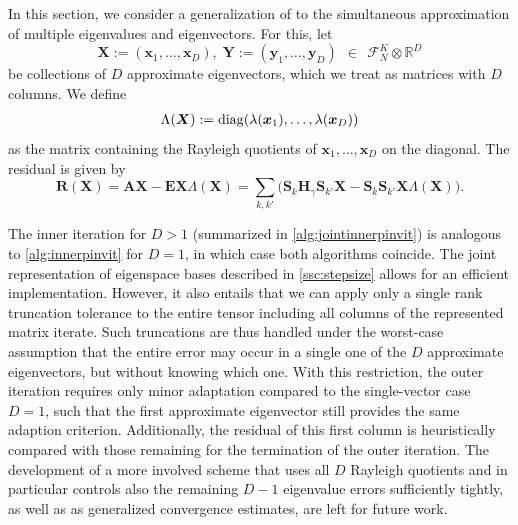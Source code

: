\documentclass[a4paper,11pt,oneside]{amsart}
\newcommand\diag{\mathop{\rm diag}}
\theoremstyle{definition}
\theoremstyle{remark}
\newcommand{\cF}{{\mathcal{F}}}
\newcommand{\A}{\ten A}
\newcommand{\E}{\ten E}
\newcommand{\R}{\mathbb{R}}
\newcommand{\ten}[1]{\boldsymbol{#1}}
\numberwithin{equation}{section}
\numberwithin{theorem}{section}
\begin{document}
In this section, we consider a generalization of  to the simultaneous approximation of multiple eigenvalues and eigenvectors. For this, let
\begin{equation}
 \ten{X} := (\ten{x}_1,\ldots,\ten{x}_D), \; \ten{Y} := (\ten{y}_1,\ldots,\ten{y}_D)\;\, \in\,\; \cF^K_N \otimes \R^D
\end{equation}
be collections of $D$ approximate eigenvectors, which we treat as matrices with $D$ columns. We define
%
%
%
%
\begin{align}\label{rpara}
 		\Lambda(\ten X) := 
%
%
 		\diag(\lambda(\ten{x}_1),\ldots,\lambda(\ten{x}_D))
\end{align}
as the matrix containing the Rayleigh quotients of $\ten{x}_1,\ldots,\ten{x}_D$ on the diagonal.
The residual is given by
\begin{equation}\label{respara}
 \ten R(\ten X) = \A \ten X - \E \ten X \Lambda(\ten X) = \sum_{k,k'} \bigl( \ten S_k \ten H_\gamma  \ten S_{k'} \ten X - \ten S_{k} \ten S_{k'} \ten X \Lambda(\ten X) \bigr).
\end{equation}

The inner iteration for $D > 1$ (summarized in \cref{alg:jointinnerpinvit}) is analogous to \cref{alg:innerpinvit} for $D = 1$, in which case both algorithms coincide. 
The joint representation of eigenspace bases described in \cref{ssc:stepsize} allows for an efficient implementation.
However, it also entails that we can apply only a single rank truncation tolerance to the entire tensor including all columns of the represented matrix iterate.
Such truncations are thus handled under the worst-case assumption that the entire error may occur in a single one of the $D$ approximate eigenvectors, but without knowing which one. With this restriction, the outer iteration requires only minor adaptation compared to the single-vector case $D=1$, such that the first approximate eigenvector still provides the same adaption criterion. Additionally, the residual of this first column is heuristically compared with those remaining for the termination of the outer iteration. The development of a more involved scheme that uses all $D$ Rayleigh quotients and in particular controls also the remaining $D-1$ eigenvalue errors sufficiently tightly, as well as as generalized convergence estimates, are left for future work.
\end{document}
